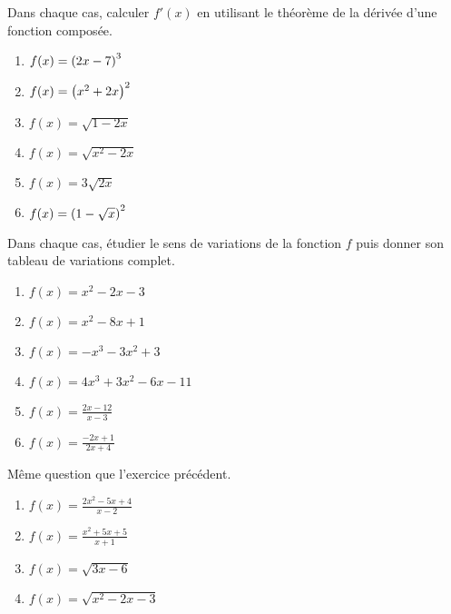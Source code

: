 \begin{exercice}
Dans chaque cas, calculer $ f'(x) $ en utilisant  le théorème  de la dérivée d'une fonction composée.
\begin{enumerate}
\item $ f(x)= \left(2x-7\right)^{3}$
\item $ f(x)=\left(x^{2}+2x\right)^{2} $  
  
\item $ f(x)=\sqrt{1-2x} $ 
\item $ f(x)=\sqrt{x^{2}-2x} $
\item $ f(x)=3\sqrt{2x} $
\item  $ f(x)=\left(1- \sqrt{x}\right)^{2} $                                                 
\end{enumerate}

  \end{exercice}
  
 
  
  \begin{exercice}
Dans chaque cas, étudier le sens de variations de la fonction $ f $ puis donner son tableau de variations complet.
\begin{enumerate}
\item $ f(x)= x^{2}-2x-3$  
\item $ f(x)= x^{2}-8x+1$ 
\item $ f(x)=-x^{3}-3x^{2} +3$ 
\item $ f(x)=4x^{3} +3x^{2}-6x-11$ 
\item $ f(x)= \frac{2x-12}{x-3} $
\item $ f(x)= \frac{-2x+1}{2x+4} $


\end{enumerate}

  \end{exercice}
  \begin{exercice}
Même question que l'exercice précédent.
\begin{enumerate}
\item $ f(x)=\frac{2x^{2}-5x+4}{x-2} $  
\item $ f(x)= \frac{x^{2}+5x+5}{x+1}$                                                   
\item $ f(x)=\sqrt{3x-6} $ 
\item $ f(x)=\sqrt{x^{2}-2x-3} $


\end{enumerate}

  \end{exercice}
  


